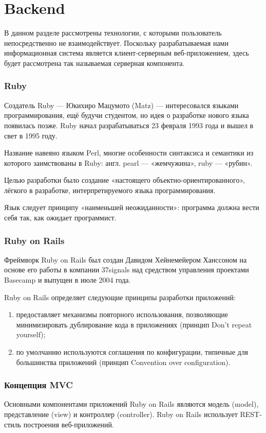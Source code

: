 \section{Backend}
В данном разделе рассмотрены технологии, с которыми пользователь непосредственно
не взаимодействует. Поскольку разрабатываемая нами информационная система
является клиент-серверным веб-приложением, здесь будет рассмотрена так
называемая серверная компонента.

\subsubsection{Ruby}
Создатель Ruby — Юкихиро Мацумото (Matz) — интересовался языками
программирования, ещё будучи студентом, но идея о разработке нового языка
появилась позже. Ruby начал разрабатываться 23 февраля 1993 года и вышел в свет
в 1995 году.

Название навеяно языком Perl, многие особенности синтаксиса и семантики из
которого заимствованы в Ruby: англ. pearl — «жемчужина», ruby — «рубин».

Целью разработки было создание «настоящего объектно-ориентированного», лёгкого в
разработке, интерпретируемого языка программирования.

Язык следует принципу «наименьшей неожиданности»: программа должна вести себя
так, как ожидает программист.

\subsubsection{Ruby on Rails}
Фреймворк Ruby on Rails был создан Давидом Хейнемейером Ханссоном на основе его
работы в компании 37signals над средством управления проектами Basecamp и
выпущен в июле 2004 года.

Ruby on Rails определяет следующие принципы разработки приложений:

\begin{enumerate}
  \item предоставляет механизмы повторного использования, 
позволяющие минимизировать дублирование кода в приложениях (принцип Don’t repeat yourself);
  \item по умолчанию используются соглашения по конфигурации, типичные для
большинства приложений (принцип Convention over configuration).
\end{enumerate}

\subsubsection{Концепция MVC}
Основными компонентами приложений Ruby on Rails являются модель (model),
представление (view) и контроллер (controller). Ruby on Rails использует
REST-стиль построения веб-приложений.

